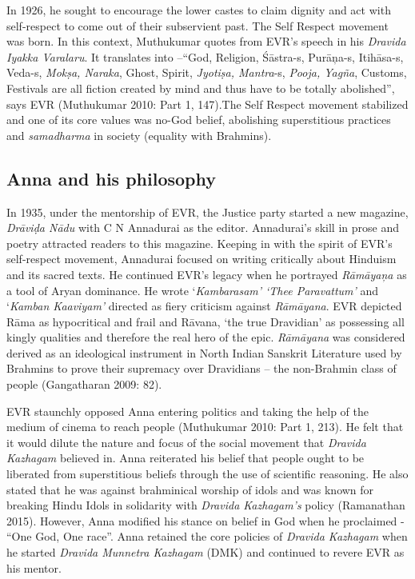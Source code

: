 In 1926, he sought to encourage the lower castes to claim dignity and act with self-respect to come out of their subservient past. The Self Respect movement was born. In this context, Muthukumar quotes from EVR’s speech in his \textit{Dravida Iyakka Varalaru}. It translates into –“God, Religion, Śāstra-s, Purāņa-s, Itihāsa-s, Veda-s, \textit{Mokṣa, Naraka}, Ghost, Spirit, \textit{Jyotiṣa, Mantra}-s,\textit{ Pooja, Yagña}, Customs, Festivals are all fiction created by mind and thus have to be totally abolished”, says EVR (Muthukumar 2010: Part 1, 147).The Self Respect movement stabilized and one of its core values was no-God belief, abolishing superstitious practices and \textit{samadharma} in society (equality with Brahmins).


\subsection*{Anna and his philosophy}

In 1935, under the mentorship of EVR, the Justice party started a new magazine, \textit{Drāviḍa Nādu} with C N Annadurai as the editor. Annadurai’s skill in prose and poetry attracted readers to this magazine. Keeping in with the spirit of EVR’s self-respect movement, Annadurai focused on writing critically about Hinduism and its sacred texts. He continued EVR’s legacy when he portrayed \textit{Rāmāyaņa} as a tool of Aryan dominance. He wrote ‘\textit{Kambarasam’ ‘Thee Paravattum’} and ‘\textit{Kamban Kaaviyam’} directed as fiery criticism against \textit{Rāmāyana}. EVR depicted Rāma as hypocritical and frail and Rāvana, ‘the true Dravidian’ as possessing all kingly qualities and therefore the real hero of the epic. \textit{Rāmāyana }was considered derived as an ideological instrument in North Indian Sanskrit Literature used by Brahmins to prove their supremacy over Dravidians – the non-Brahmin class of people (Gangatharan 2009: 82).

EVR staunchly opposed Anna entering politics and taking the help of the medium of cinema to reach people (Muthukumar 2010: Part 1, 213). He felt that it would dilute the nature and focus of the social movement that \textit{Dravida Kazhagam} believed in. Anna reiterated his belief that people ought to be liberated from superstitious beliefs through the use of scientific reasoning. He also stated that he was against brahminical worship of idols and was known for breaking Hindu Idols in solidarity with \textit{Dravida Kazhagam’s} policy (Ramanathan 2015). However, Anna modified his stance on belief in God when he proclaimed - “One God, One race”. Anna retained the core policies of \textit{Dravida Kazhagam} when he started \textit{Dravida Munnetra Kazhagam} (DMK) and continued to revere EVR as his mentor.


